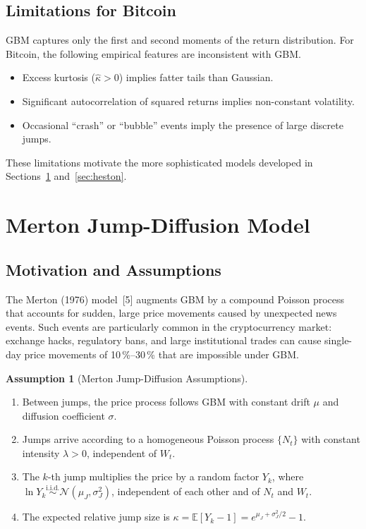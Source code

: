 \documentclass[12pt, a4paper, oneside]{report}
\theoremstyle{plain}
\theoremstyle{definition}
\newtheorem{assumption}[theorem]{Assumption}
\theoremstyle{remark}
\newcommand{\E}{\mathbb{E}}
\begin{document}
\subsection{Limitations for Bitcoin}

GBM captures only the first and second moments of the return distribution.
For Bitcoin, the following empirical features are inconsistent with GBM.

\begin{itemize}[leftmargin=1.25cm]
  \item Excess kurtosis ($\hat\kappa > 0$) implies fatter tails than Gaussian.
  \item Significant autocorrelation of squared returns implies non-constant volatility.
  \item Occasional ``crash'' or ``bubble'' events imply the presence of large discrete jumps.
\end{itemize}

These limitations motivate the more sophisticated models developed in
Sections~\ref{sec:merton} and~\ref{sec:heston}.

\section{Merton Jump-Diffusion Model}
\label{sec:merton}

\subsection{Motivation and Assumptions}

The Merton (1976) model~[5] augments GBM by a compound Poisson process that accounts
for sudden, large price movements caused by unexpected news events.  Such events are
particularly common in the cryptocurrency market: exchange hacks, regulatory bans, and
large institutional trades can cause single-day price movements of 10\,\%--30\,\% that
are impossible under GBM.

\begin{assumption}[Merton Jump-Diffusion Assumptions]
\label{ass:merton}
\begin{enumerate}[leftmargin=1.25cm, label=\textup{(M\arabic*)}]
  \item Between jumps, the price process follows GBM with constant drift $\mu$ and
    diffusion coefficient $\sigma$.
  \item Jumps arrive according to a homogeneous Poisson process $\{N_t\}$ with
    constant intensity $\lambda > 0$, independent of $W_t$.
  \item The $k$-th jump multiplies the price by a random factor $Y_k$, where
    $\ln Y_k \overset{\text{i.i.d.}}{\sim} \mathcal{N}(\mu_J, \sigma_J^2)$,
    independent of each other and of $N_t$ and $W_t$.
  \item The expected relative jump size is
    $\kappa = \E[Y_k - 1] = e^{\mu_J + \sigma_J^2/2} - 1$.
\end{enumerate}
\end{assumption}
\end{document}
